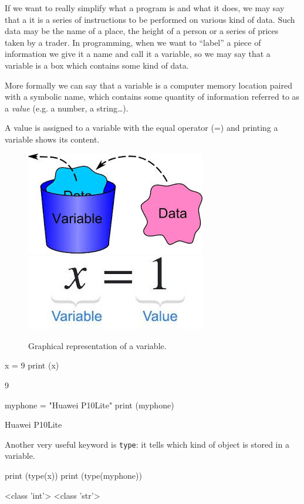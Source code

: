 If we want to really simplify what a program is and what it does, we may say that a it is a series of instructions to be performed on various kind of data. Such data may be the name of a place, the height of a person or a series of prices taken by a trader. In programming, when we want to “label” a piece of information we give it a name and call it a variable, so we may say that a variable is a box which contains some kind of data.

More formally we can say that a variable is a computer memory location paired with a symbolic name, which contains some quantity of information referred to as a \emph{value} (e.g. a number, a string\ldots). 

A value is assigned to a variable with the equal operator (=) and printing a variable shows its content. 

\begin{figure}[h]
\centering
\includegraphics[width=0.35\linewidth]{figures/var1.jpeg}\\
\includegraphics[width=0.35\linewidth]{figures/var2.jpeg}
\caption{Graphical representation of a variable.}
\end{figure}

\begin{ipython}
x = 9 
print (x)
\end{ipython}
\begin{ioutput}
9
\end{ioutput}
\begin{ipython}
myphone = "Huawei P10Lite" 
print (myphone)
\end{ipython}
\begin{ioutput}
Huawei P10Lite	
\end{ioutput}

Another very useful keyword is \texttt{type}: it tells which kind of object is stored in a variable.

\begin{ipython}
print (type(x))
print (type(myphone))
\end{ipython}
\begin{ioutput}
<class 'int'>
<class 'str'>
\end{ioutput}

